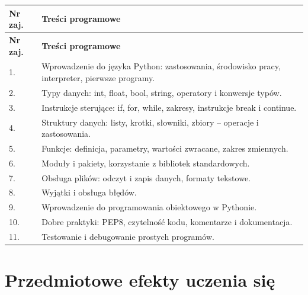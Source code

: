 \documentclass[12pt, a4paper]{article}
\newcommand{\thdrule}{\noalign{\global\setlength{\extrarowheight}{0pt}}}
\newcommand{\thdend}{\noalign{\global\setlength{\extrarowheight}{3pt}}}
\begin{document}
{\scriptsize
\begin{longtable}{m{1.5cm}m{14.5cm}}
\thdrule\toprule
\rowcolor{pjatkRed} {\color{white}\textbf{Nr zaj.}} & {\color{white}\textbf{Treści programowe}} \\
\midrule\thdend
\endfirsthead
\thdrule\toprule
\rowcolor{pjatkRed} {\color{white}\textbf{Nr zaj.}} & {\color{white}\textbf{Treści programowe}} \\
\midrule\thdend
\endhead
  \rowcolor{tableRowLight} 1. & Wprowadzenie do języka Python: zastosowania, środowisko pracy, interpreter, pierwsze programy. \\
  \rowcolor{tableRowAlt} 2. & Typy danych: int, float, bool, string, operatory i konwersje typów. \\
  \rowcolor{tableRowLight} 3. & Instrukcje sterujące: if, for, while, zakresy, instrukcje break i continue. \\
  \rowcolor{tableRowAlt} 4. & Struktury danych: listy, krotki, słowniki, zbiory – operacje i zastosowania. \\
  \rowcolor{tableRowLight} 5. & Funkcje: definicja, parametry, wartości zwracane, zakres zmiennych. \\
  \rowcolor{tableRowAlt} 6. & Moduły i pakiety, korzystanie z bibliotek standardowych. \\
  \rowcolor{tableRowLight} 7. & Obsługa plików: odczyt i zapis danych, formaty tekstowe. \\
  \rowcolor{tableRowAlt} 8. & Wyjątki i obsługa błędów. \\
  \rowcolor{tableRowLight} 9. & Wprowadzenie do programowania obiektowego w Pythonie. \\
  \rowcolor{tableRowAlt} 10. &  Dobre praktyki: PEP8, czytelność kodu, komentarze i dokumentacja. \\
  \rowcolor{tableRowLight} 11. &  Testowanie i debugowanie prostych programów. \\
\bottomrule
\end{longtable}}

\section{Przedmiotowe efekty uczenia się}
\end{document}
